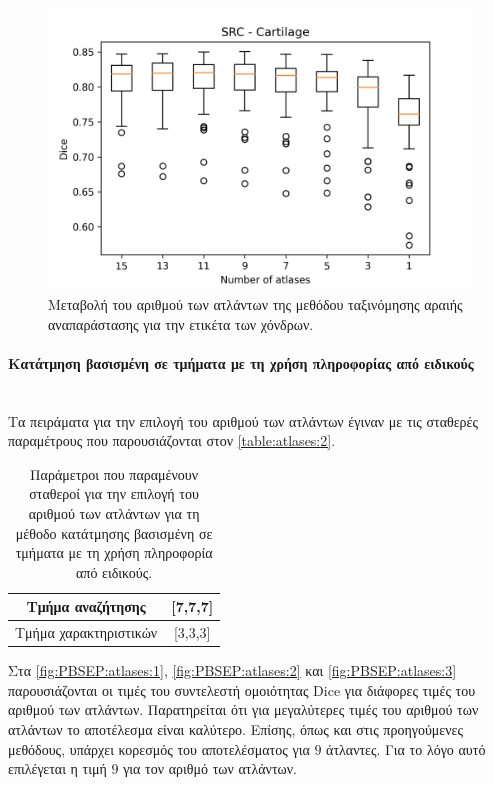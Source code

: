 \documentclass[a4paper,12pt]{article}
\newcommand{\paragraphLine}[1]{\paragraph{#1}\mbox{}\\}
\begin{document}
\begin{figure}[H]
    \centering
    \includegraphics[width=0.85\linewidth]{SRC_Number_of_atlases_Cartilage_plot.png}
    \caption{Μεταβολή του αριθμού των ατλάντων της μεθόδου ταξινόμησης αραιής
             αναπαράστασης για την ετικέτα των χόνδρων.}
    \label{fig:SRC:atlases:3}
\end{figure}

\paragraphLine{Κατάτμηση βασισμένη σε τμήματα με τη χρήση πληροφορίας από
               ειδικούς}

Τα πειράματα για την επιλογή του αριθμού των ατλάντων έγιναν με τις σταθερές
παραμέτρους που παρουσιάζονται στον \autoref{table:atlases:2}.

\begin{table}[h!]
    \centering
    \begin{tabular}{|c|c|} 
        \hline
        Τμήμα αναζήτησης & [7,7,7] \\ 
        \hline
        Τμήμα χαρακτηριστικών & [3,3,3] \\ 
        \hline
    \end{tabular}
    \caption{Παράμετροι που παραμένουν σταθεροί για την επιλογή του αριθμού των
             ατλάντων για τη μέθοδο κατάτμησης βασισμένη σε τμήματα με τη χρήση
             πληροφορία από ειδικούς.}
    \label{table:atlases:2}
\end{table}

Στα \autoref{fig:PBSEP:atlases:1}, \autoref{fig:PBSEP:atlases:2} και
\autoref{fig:PBSEP:atlases:3} παρουσιάζονται οι τιμές του συντελεστή ομοιότητας
Dice για διάφορες τιμές του αριθμού των ατλάντων. Παρατηρείται ότι για
μεγαλύτερες τιμές του αριθμού των ατλάντων το αποτέλεσμα είναι καλύτερο. Επίσης,
όπως και στις προηγούμενες μεθόδους, υπάρχει κορεσμός του αποτελέσματος για $9$
άτλαντες. Για το λόγο αυτό επιλέγεται η τιμή $9$ για τον αριθμό των ατλάντων.
\end{document}
